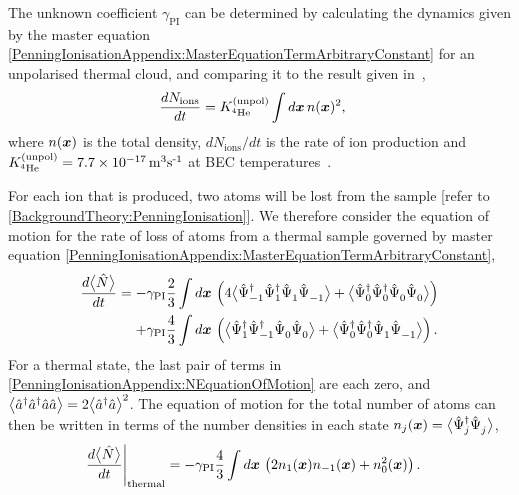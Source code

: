 The unknown coefficient $\gamma_\text{PI}$ can be determined by calculating the dynamics given by the master equation \eqref{PenningIonisationAppendix:MasterEquationTermArbitraryConstant} for an unpolarised thermal cloud, and comparing it to the result given in~\citep{Stas:2006kx},
\begin{align}
    \frac{d N_\text{ions}}{d t} &= \Kunpol \int d \vect{x}\, n(\vect{x})^2,
    \label{PenningIonisationAppendix:ThermalSampleStas}
\end{align}
where $n(\bm{x})$ is the total density, $dN_\text{ions}/dt$ is the rate of ion production and $\Kunpol = \unit[7.7 \times 10^{-17}]{m\textsuperscript{3}s\textsuperscript{-1}}$ at BEC temperatures~\citep{Stas:2006kx}.

For each ion that is produced, two atoms will be lost from the sample [refer to \eqref{BackgroundTheory:PenningIonisation}]. We therefore consider the equation of motion for the rate of loss of atoms from a thermal sample governed by master equation \eqref{PenningIonisationAppendix:MasterEquationTermArbitraryConstant},
\begin{align}
    \label{PenningIonisationAppendix:NEquationOfMotion}
    \begin{split}
        \frac{d \mean{\hat{N}}}{d t} &= - \gamma_\text{PI} \frac{2}{3}\int d \vect{x}\, \left(4 \mean{\hat{\Psi}_{-1}^\dagger \hat{\Psi}_1^\dagger \hat{\Psi}_1^{\phantom{\dagger}}\hat{\Psi}_{-1}^{\phantom{\dagger}}} + \mean{\hat{\Psi}_0^\dagger \hat{\Psi}_0^\dagger \hat{\Psi}_0^{\phantom{\dagger}} \hat{\Psi}_0^{\phantom{\dagger}}}\right)\\
        &\relphantom{=} + \gamma_\text{PI} \frac{4}{3}\int d \vect{x}\, \left( \mean{\hat{\Psi}_1^\dagger \hat{\Psi}_{-1}^\dagger \hat{\Psi}_0^{\phantom{\dagger}} \hat{\Psi}_0^{\phantom{\dagger}}} +  \mean{\hat{\Psi}_0^\dagger \hat{\Psi}_0^\dagger \hat{\Psi}_1^{\phantom{\dagger}} \hat{\Psi}_{-1}^{\phantom{\dagger}}} \right).
    \end{split}
\end{align}
For a thermal state, the last pair of terms in \eqref{PenningIonisationAppendix:NEquationOfMotion} are each zero, and ${\big<\hat{a}^\dagger \hat{a}^\dagger \hat{a} \hat{a}\big>} = 2 {\big<\hat{a}^\dagger \hat{a}\big>}^2$. The equation of motion for the total number of atoms can then be written in terms of the number densities in each state $n_j(\bm{x}) = {\big<\hat{\Psi}_j^\dagger \hat{\Psi}_j^{\phantom{\dagger}}\big>}$,
\begin{align}
    \left.\frac{d {\big<\hat{N}\big>}}{dt} \right|_\text{thermal} &= - \gamma_\text{PI} \frac{4}{3} \int d \bm{x}\, \left(2 n_1(\bm{x}) n_{-1}(\bm{x}) + n_0^2(\bm{x})\right).
\end{align}
